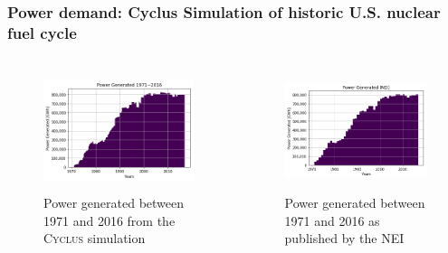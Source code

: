 \begin{frame}
  \frametitle{Power demand: Cyclus Simulation of historic U.S. nuclear fuel cycle}
  \begin{columns}
    \column[t]{5cm}
    \begin{figure}[htbp!]
      \begin{center}
        \includegraphics[height=3.5cm]{../figures/power_gen_cyclus}
      \end{center}
            \caption{Power generated between 1971 and 2016 from the \textsc{Cyclus} simulation}
    \end{figure}
    \column[t]{5cm}
    \begin{figure}[htbp!]
      \begin{center}
        \includegraphics[height=3.5cm]{../figures/power_gen_nei}
      \end{center}
            \caption{Power generated between 1971 and 2016 as published by the NEI \cite{nei_u.s._2018}}
    \end{figure}
  \end{columns}
\end{frame}


